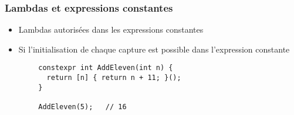 \documentclass[C++.tex]{subfiles}
\begin{document}
\begin{frame}[fragile]
	\frametitle{Lambdas et expressions constantes}
	\begin{itemize}
		\item Lambdas autorisées dans les expressions constantes
		\item Si l'initialisation de chaque capture est possible dans l'expression constante
	\end{itemize}

	\begin{verbatim}
		constexpr int AddEleven(int n) {
		  return [n] { return n + 11; }();
		}

		AddEleven(5);   // 16
	\end{verbatim}


\end{frame}
\end{document}
